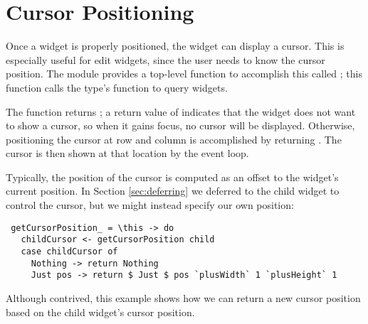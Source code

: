 \section{Cursor Positioning}

Once a widget is properly positioned, the widget can display a cursor.
This is especially useful for edit widgets, since the user needs to
know the cursor position.  The  module provides a top-level
function to accomplish this called ; this
function calls the  type's 
function to query widgets.

The  function returns ; a return value of  indicates that the
widget does not want to show a cursor, so when it gains focus, no
cursor will be displayed.  Otherwise, positioning the cursor at row
 and column  is accomplished by returning .  The cursor is then shown at that location by
the event loop.

Typically, the position of the cursor is computed as an offset to the
widget's current position.  In Section \ref{sec:deferring} we deferred
to the child widget to control the cursor, but we might instead
specify our own position:

\begin{verbatim}
 getCursorPosition_ = \this -> do
   childCursor <- getCursorPosition child
   case childCursor of
     Nothing -> return Nothing
     Just pos -> return $ Just $ pos `plusWidth` 1 `plusHeight` 1
\end{verbatim}

Although contrived, this example shows how we can return a new cursor
position based on the child widget's cursor position.

